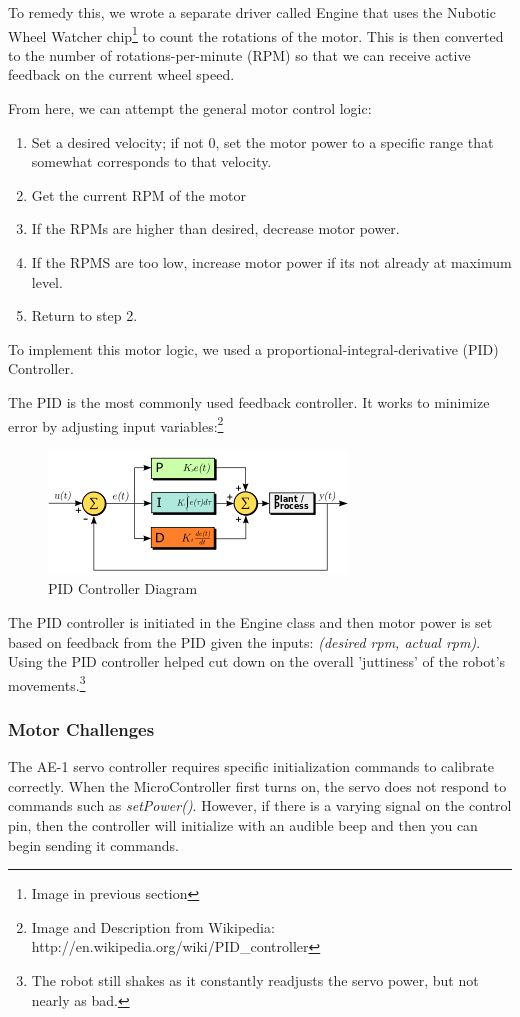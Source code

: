 \documentclass[12pt]{article}
\begin{document}
To remedy this, we wrote a separate driver called Engine that uses the Nubotic Wheel Watcher chip\footnote{Image in previous section} to count the rotations of the motor.  This is then converted to the number of rotations-per-minute (RPM) so that we can receive active feedback on the current wheel speed.

From here, we can attempt the general motor control logic:
\begin{enumerate}
\item Set a desired velocity; if not 0, set the motor power to a specific range that somewhat corresponds to that velocity.
\item Get the current RPM of the motor
\item If the RPMs are  higher than desired, decrease motor power.
\item If the RPMS are too low, increase motor power if its not already at maximum level.
\item Return to step 2.
\end{enumerate}

To implement this motor logic, we used a proportional-integral-derivative (PID) Controller.

The PID is the most commonly used feedback controller.  It works to minimize error by adjusting input variables:\footnote{Image and Description from Wikipedia: http://en.wikipedia.org/wiki/PID\_controller}
\begin{figure}[h]
\centerline{\includegraphics{img/PID}}
\caption{PID Controller Diagram}
\end{figure}

The PID controller is initiated in the Engine class and then motor power is set based on feedback from the PID given the inputs: \textit{(desired rpm, actual rpm)}.  Using the PID controller helped cut down on the overall 'juttiness' of the robot's movements.\footnote{The robot still shakes as it constantly readjusts the servo power, but not nearly as bad.}

\subsubsection*{Motor Challenges}
The AE-1 servo controller requires specific initialization commands to calibrate correctly.  When the MicroController first turns on, the servo does not respond to commands such as \textit{setPower()}.  However, if there is a varying signal on the control pin, then the controller will initialize with an audible beep and then you can begin sending it commands.
\end{document}

